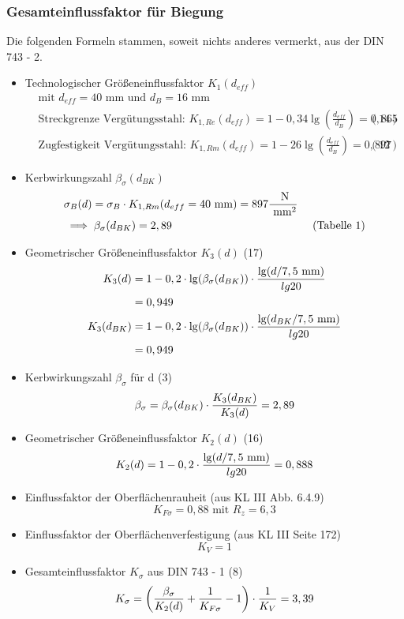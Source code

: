 \subsubsection{Gesamteinflussfaktor für Biegung}
Die folgenden Formeln stammen, soweit nichts anderes vermerkt, aus der DIN 743 - 2.
\begin{itemize}
	\item Technologischer Größeneinflussfaktor $K_1 (d_{eff})$ 
	\begin{align*}
		&\text{mit } d_{eff} = 40 \text{ mm und }d_B = 16 \text{ mm} \\ 
		&\text{Streckgrenze Vergütungsstahl: }K_{1,Re}(d_{eff}) = 1 - 0,34 \lg \left( \frac{d_{eff}}{d_B} \right) = 0,865  &(14) \\
		&\text{Zugfestigkeit Vergütungsstahl: } K_{1,Rm}(d_{eff}) = 1 - 26 \lg \left( \frac{d_{eff}}{d_B} \right) = 0,897  &(12) 
	\end{align*}
	\item Kerbwirkungszahl $\beta_{\sigma} (d_{BK})$
	\begin{align*}
		&\sigma_B (d) = \sigma_B \cdot K_{1,Rm} (d_{eff} = 40 \text{ mm}) = 897 \frac{\text{ N}}{\text{ mm}^2} \\
		&\implies \beta_{\sigma}(d_{BK})	= 2,89  & \text{ (Tabelle 1)} 
	\end{align*}
	\item  Geometrischer Größeneinflussfaktor $K_3 (d)$ \hfill (17)
	\begin{align*}
		K_3(d) &= 1 - 0,2 \cdot \lg ( \beta_{\sigma} (d_{BK})) \cdot \frac{\lg (d / 7,5 \text{ mm})}{lg 20} \\
		&= 0,949 \\
		K_3(d_{BK}) &= 1 - 0,2 \cdot \lg ( \beta_{\sigma} (d_{BK})) \cdot \frac{\lg (d_{BK} / 7,5 \text{ mm})}{lg 20} \\
		&= 0,949 
	\end{align*}
	\item Kerbwirkungszahl $\beta_{\sigma}$ für d \hfill (3)
	\[
		\beta_{\sigma} = \beta_{\sigma} (d_{BK}) \cdot \frac{K_3 (d_{BK})}{K_3 (d)} = 2,89
	\]
	\item Geometrischer Größeneinflussfaktor $K_2 (d)$ \hfill (16)
	\[
		K_2 (d) = 1 -0,2 \cdot  \frac{\lg (d / 7,5 \text{ mm})}{lg 20}  = 0,888
	\]
	\item Einflussfaktor der Oberflächenrauheit (aus KL III  Abb. 6.4.9)
	\[
		K_{F \sigma} = 0,88 \text{ mit } R_z = 6,3
	\]
	\item Einflussfaktor der Oberflächenverfestigung (aus KL III  Seite 172)
	\[
	K_{V} = 1
	\]
	\item  Gesamteinflussfaktor $K_{\sigma}$ aus DIN 743 - 1 \hfill (8)
	\[
		K_{\sigma} = \left( \frac{\beta_{\sigma}}{K_2 (d)} + \frac{1}{K_{F\sigma}} -1 \right) \cdot \frac{1}{K_V} = 3,39 
	\]
\end{itemize}
